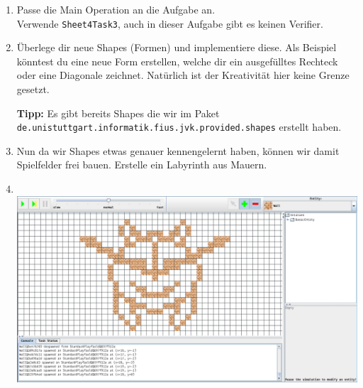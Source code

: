 
\begin{enumerate}
	\item
	Passe die Main Operation an die Aufgabe an.\\
	Verwende \lstinline{Sheet4Task3}, auch in dieser Aufgabe gibt es keinen Verifier.
	
	\item
	Überlege dir neue Shapes (Formen) und implementiere diese.
	Als Beispiel könntest du eine neue Form erstellen, welche dir ein ausgefülltes Rechteck oder eine Diagonale zeichnet.
	Natürlich ist der Kreativität hier keine Grenze gesetzt.
	
	\textbf{Tipp:} Es gibt bereits Shapes die wir im Paket \lstinline{de.unistuttgart.informatik.fius.jvk.provided.shapes} erstellt haben.
	
	\item
	Nun da wir Shapes etwas genauer kennengelernt haben, können wir damit Spielfelder frei bauen.
	Erstelle ein Labyrinth aus Mauern.
	
	\item
	\\
		\includegraphics[width=\linewidth]{./figures/playfield.png}

\end{enumerate}

\newpage
